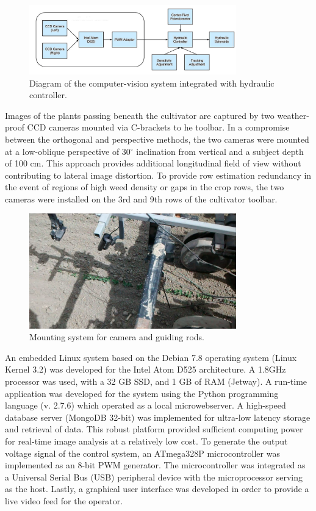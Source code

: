 \documentclass[authoryear]{elsarticle}
\begin{document}
\begin{figure}[H]
  \centering
  \includegraphics[width=0.8\textwidth,natwidth=610,natheight=642]{agcv_diagram.png}
  \caption{Diagram of the computer-vision system integrated with hydraulic controller.}
\end{figure}

Images of the plants passing beneath the cultivator are captured by
two weather-proof CCD cameras mounted via C-brackets to he toolbar.
In a compromise between the orthogonal and perspective methods, the
two cameras were mounted at a low-oblique perspective of 30$^{\circ}$
inclination from vertical and a subject depth of 100 cm. This approach
provides additional longitudinal field of view without contributing to
lateral image distortion. To provide row estimation redundancy in the
event of regions of high weed density or gaps in the crop rows, the
two cameras were installed on the 3rd and 9th rows of the cultivator
toolbar.

\begin{figure}[H]
  \centering
  \includegraphics[width=0.8\textwidth,natwidth=610,natheight=642]{cam_mount.png}
  \caption{Mounting system for camera and guiding rods.}
\end{figure}

An embedded Linux system based on the Debian 7.8 operating system
(Linux Kernel 3.2) was developed for the Intel Atom D525
architecture. A 1.8GHz processor was used, with a 32 GB SSD, and 1 GB
of RAM (Jetway). A run-time application was developed for the system
using the Python programming language (v. 2.7.6) which operated as a
local microwebserver. A high-speed database server (MongoDB 32-bit)
was implemented for ultra-low latency storage and retrieval of
data. This robust platform provided sufficient computing power for
real-time image analysis at a relatively low cost. To generate the
output voltage signal of the control system, an
ATmega328P microcontroller was implemented as an 8-bit PWM generator. The
microcontroller was integrated as a Universal Serial Bus (USB)
peripheral device with the microprocessor serving as the
host. Lastly, a graphical user interface was developed in order to provide a
live video feed for the operator.
\end{document}
